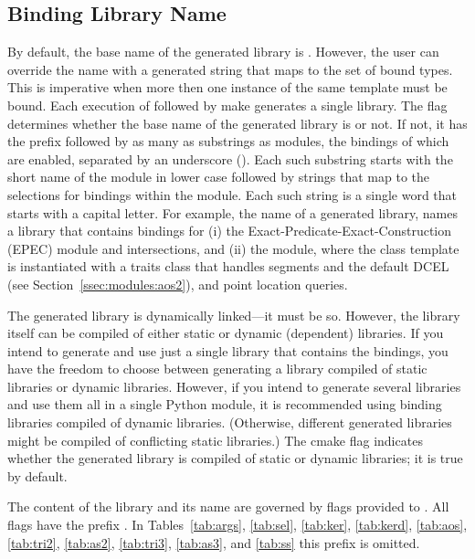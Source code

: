 \subsection{Binding Library Name}
\label{sec:gen:libraryName}
By default, the base name of the generated library is
. However, the user can override the name with a
generated string that maps to the set of bound types. This is
imperative when more then one instance of the same template must be
bound. Each execution of  followed by make
generates a single library. The \cmake{} flag
 determines whether the base
name of the generated library is  or not. If not,
it has the prefix  followed by as many as
substrings as modules, the bindings of which are enabled, separated by
an underscore (\myLstinline{_}). Each such substring starts with the
short name of the module in lower case followed by strings that map to
the selections for bindings within the module. Each such string is a
single word that starts with a capital letter. For example, the name
 of a generated
library, names a library that contains bindings for (i) the
Exact-Predicate-Exact-Construction (EPEC)
\iiDandiiiDGeometryKernelPackage{} module and intersections, and (ii)
the \iiDArrangementsPackage{} module, where the
 class template is instantiated with a
traits class that handles segments and the default DCEL (see
Section~\ref{ssec:modules:aos2}), and point location queries.

The generated library is dynamically linked---it must be so. However,
the library itself can be compiled of either static or dynamic
(dependent) libraries. If you intend to generate and use just a single
library that contains the bindings, you have the freedom to choose
between generating a library compiled of static libraries or dynamic
libraries. However, if you intend to generate several libraries and
use them all in a single Python module, it is recommended using
binding libraries compiled of dynamic libraries. (Otherwise, different
generated libraries might be compiled of conflicting static
libraries.) The cmake flag 
indicates whether the generated library is compiled of static or
dynamic libraries; it is true by default.

The content of the library and its name are governed by flags provided
to . All flags have the prefix
. In Tables~\ref{tab:args}, \ref{tab:sel},
\ref{tab:ker}, \ref{tab:kerd}, \ref{tab:aos}, \ref{tab:tri2},
\ref{tab:as2}, \ref{tab:tri3}, \ref{tab:as3}, and \ref{tab:ss} this
prefix is omitted.

